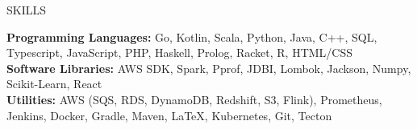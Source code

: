 \documentclass{resume} %
\begin{document}
\begin{rSection}{SKILLS}

\textbf{Programming Languages:} Go, Kotlin, Scala, Python, Java, C++, SQL, Typescript, JavaScript, PHP, Haskell, Prolog, Racket, R, HTML/CSS  \\
\textbf{Software Libraries:} AWS SDK, Spark, Pprof, JDBI, Lombok, Jackson, Numpy, Scikit-Learn, React  \\
\textbf{Utilities:} AWS (SQS, RDS, DynamoDB, Redshift, S3, Flink), Prometheus, Jenkins, Docker, Gradle, Maven, \LaTeX, Kubernetes, Git, Tecton  
\end{rSection}
\end{document}

